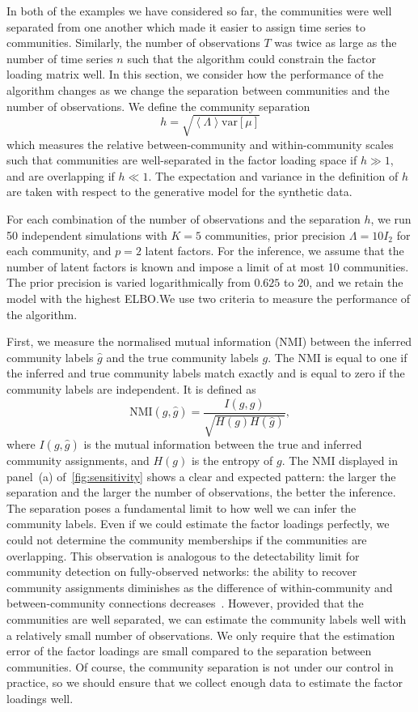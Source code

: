 \documentclass[onecolumn,pre,superscriptaddress, longbibliography, nofootinbib, notitlepage]{revtex4-1}
\newcommand{\E}[1]{\left\langle#1 \right\rangle}
\newcommand{\var}{\mathrm{var}}
\begin{document}
In both of the examples we have considered so far, the communities were well separated from one another which made it easier to assign time series to communities. Similarly, the number of observations $T$ was twice as large as the number of time series $n$ such that the algorithm could constrain the factor loading matrix well. In this section, we consider how the performance of the algorithm changes as we change the separation between communities and the number of observations. We define the community separation
\[
    h = \sqrt{\E{\Lambda} \var [\mu]}
\]
which measures the relative between-community and within-community scales such that communities are well-separated in the factor loading space if $h\gg 1$, and are overlapping if $h\ll 1$. The expectation and variance in the definition of $h$ are taken with respect to the generative model for the synthetic data. 

For each combination of the number of observations and the separation $h$, we run 50 independent simulations with $K=5$ communities, prior precision $\Lambda=10 I_2$ for each community, and $p=2$ latent factors. For the inference, we assume that the number of latent factors is known and impose a limit of at most 10 communities. The prior precision is varied logarithmically from $0.625$ to $20$, and we retain the model with the highest ELBO.\@ We use two criteria to measure the performance of the algorithm.

First, we measure the normalised mutual information (NMI) between the inferred community labels $\hat g$ and the true community labels $g$. The NMI is equal to one if the inferred and true community labels match exactly and is equal to zero if the community labels are independent. It is defined as~\cite{Strehl2002}
\[
    \mathrm{NMI}(g, \hat{g})= \frac{I(g, \hat{g})}{\sqrt{H(g) H(\hat{g})}},
\]
where $I(g, \hat{g})$ is the mutual information between the true and inferred community assignments, and $H(g)$ is the entropy of $g$. The NMI displayed in panel~(a) of~\cref{fig:sensitivity} shows a clear and expected pattern: the larger the separation and the larger the number of observations, the better the inference. The separation poses a fundamental limit to how well we can infer the community labels. Even if we could estimate the factor loadings perfectly, we could not determine the community memberships if the communities are overlapping. This observation is analogous to the detectability limit for community detection on fully-observed networks: the ability to recover community assignments diminishes as the difference of within-community and between-community connections decreases~\cite{decelle2011inference}. 
However, provided that the communities are well separated, we can estimate the community labels well with a relatively small number of observations. We only require that the estimation error of the factor loadings are small compared to the separation between communities. 
Of course, the community separation is not under our control in practice, so we should ensure that we collect enough data to estimate the factor loadings well.
\end{document}
